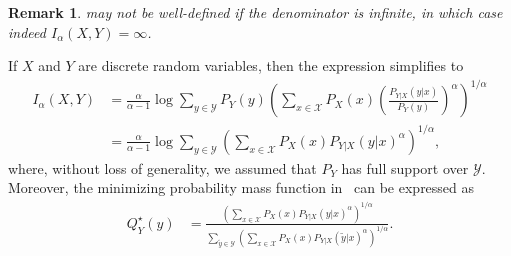 \documentclass{article}
\numberwithin{theorem}{section}
\numberwithin{example}{section}
\newtheorem{remark}{Remark}
\numberwithin{remark}{section}
\numberwithin{definition}{section}
\newcommand{\X}{\mathcal{X}}
\newcommand{\Y}{\mathcal{Y}}
\begin{document}
\begin{remark}
     may not be well-defined if the denominator is infinite, in which case indeed $I_\alpha(X,Y) = \infty$.
\end{remark}


If $X$ and $Y$ are discrete random variables, then the expression simplifies to
\begin{align} 
   I_\alpha(X,Y) & = \frac{\alpha}{\alpha-1} \log \sum_{y \in \Y} P_Y(y) \left( \sum_{x \in \X} P_X(x) \left( \frac{P_{Y|X}(y|x)}{P_Y(y)} \right)^{\alpha} \right)^{1/\alpha} \nonumber \\
    & = \frac{\alpha}{\alpha-1} \log \sum_{y \in \Y}  \left( \sum_{x \in \X} P_X(x) P_{Y|X}(y|x)^{\alpha} \right)^{1/\alpha},\label{eq:Ialpha-discrete-formula}
\end{align}
where, without loss of generality, we assumed that $P_Y$ has full support over $\Y$.
Moreover, the minimizing probability mass function in~ can be expressed as
\begin{align}\label{eq:qstarIalpha:discrete}
    Q_Y^\star(y) &=  \frac{\left(\sum_{x \in \X} P_X(x) P_{Y|X}(y|x)^{\alpha}\right)^{1/\alpha}}{\sum_{\tilde{y} \in \Y}\left(\sum_{x \in \X} P_X(x) P_{Y|X}(\tilde{y}|x)^{\alpha}\right)^{1/\alpha}}.
\end{align}
\end{document}
